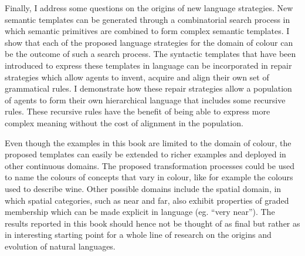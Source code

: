 Finally, I address some questions on the origins of new language
strategies. New semantic templates can be generated through a
combinatorial search process in which semantic primitives are combined
to form complex semantic templates. I show that each of the proposed
language strategies for the domain of colour can be the outcome of
such a search process. The syntactic templates that have been
introduced to express these templates in language can be incorporated
in repair strategies which allow agents to invent, acquire and align
their own set of grammatical rules. I demonstrate how these repair
strategies allow a population of agents to form their own hierarchical
language that includes some recursive rules. These recursive rules
have the benefit of being able to express more complex meaning without
the cost of alignment in the population.

Even though the examples in this book are limited to the domain of
colour, the proposed templates can easily be extended to richer
examples and deployed in other continuous domains. The proposed
transformation processes could be used to name the colours of concepts
that vary in colour, like for example the colours used to describe
wine. Other possible domains include the spatial domain, in which
spatial categories, such as near and far, also exhibit properties of
graded membership which can be made explicit in language (eg. ``very
near'').  The results reported in this book should hence not be
thought of as final but rather as in interesting starting
point for a whole line of research on the origins and evolution of
natural languages.
